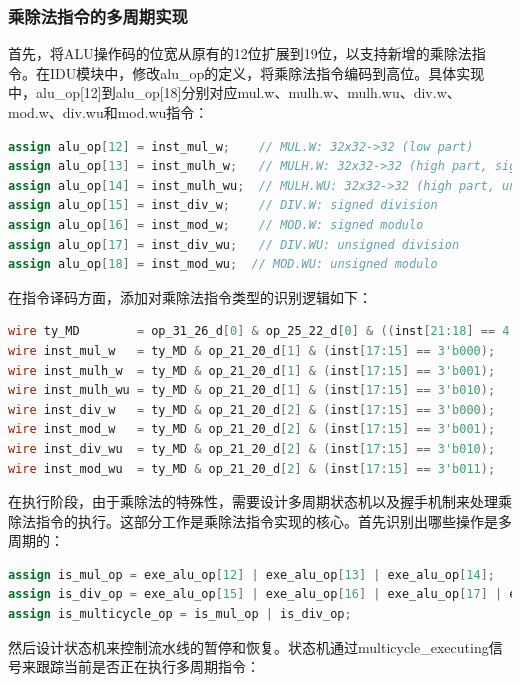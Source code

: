 \documentclass[11pt]{article}
\begin{document}
\subsubsection{乘除法指令的多周期实现}

首先，将ALU操作码的位宽从原有的12位扩展到19位，以支持新增的乘除法指令。在IDU模块中，修改alu\_op的定义，将乘除法指令编码到高位。具体实现中，alu\_op[12]到alu\_op[18]分别对应mul.w、mulh.w、mulh.wu、div.w、mod.w、div.wu和mod.wu指令：

\begin{lstlisting}[language=verilog]
assign alu_op[12] = inst_mul_w;    // MUL.W: 32x32->32 (low part)
assign alu_op[13] = inst_mulh_w;   // MULH.W: 32x32->32 (high part, signed)
assign alu_op[14] = inst_mulh_wu;  // MULH.WU: 32x32->32 (high part, unsigned)
assign alu_op[15] = inst_div_w;    // DIV.W: signed division
assign alu_op[16] = inst_mod_w;    // MOD.W: signed modulo
assign alu_op[17] = inst_div_wu;   // DIV.WU: unsigned division
assign alu_op[18] = inst_mod_wu;  // MOD.WU: unsigned modulo
\end{lstlisting}

在指令译码方面，添加对乘除法指令类型的识别逻辑如下：

\begin{lstlisting}[language=verilog]
wire ty_MD        = op_31_26_d[0] & op_25_22_d[0] & ((inst[21:18] == 4'b0111) | (inst[21:18] == 4'b1000));
wire inst_mul_w   = ty_MD & op_21_20_d[1] & (inst[17:15] == 3'b000);
wire inst_mulh_w  = ty_MD & op_21_20_d[1] & (inst[17:15] == 3'b001);
wire inst_mulh_wu = ty_MD & op_21_20_d[1] & (inst[17:15] == 3'b010);
wire inst_div_w   = ty_MD & op_21_20_d[2] & (inst[17:15] == 3'b000);
wire inst_mod_w   = ty_MD & op_21_20_d[2] & (inst[17:15] == 3'b001);
wire inst_div_wu  = ty_MD & op_21_20_d[2] & (inst[17:15] == 3'b010);
wire inst_mod_wu  = ty_MD & op_21_20_d[2] & (inst[17:15] == 3'b011);
\end{lstlisting}

在执行阶段，由于乘除法的特殊性，需要设计多周期状态机以及握手机制来处理乘除法指令的执行。这部分工作是乘除法指令实现的核心。首先识别出哪些操作是多周期的：

\begin{lstlisting}[language=verilog]
assign is_mul_op = exe_alu_op[12] | exe_alu_op[13] | exe_alu_op[14];
assign is_div_op = exe_alu_op[15] | exe_alu_op[16] | exe_alu_op[17] | exe_alu_op[18];
assign is_multicycle_op = is_mul_op | is_div_op;
\end{lstlisting}

然后设计状态机来控制流水线的暂停和恢复。状态机通过multicycle\_executing信号来跟踪当前是否正在执行多周期指令：
\end{document}
